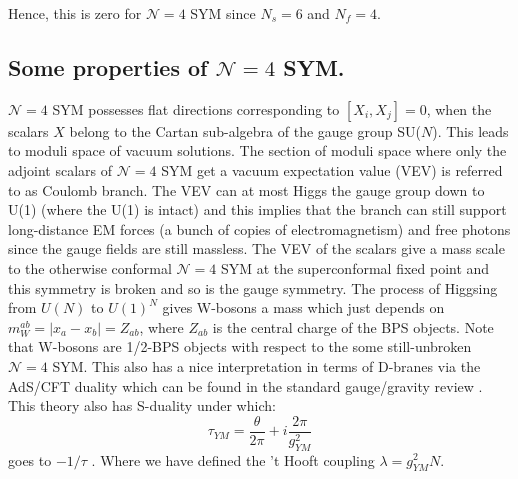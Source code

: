  Hence, this is zero for $\mathcal{N} = 4 $ SYM since $N_{s} = 6$ and $N_{f} = 4$. 
 
\subsection{Some properties of $\mathcal{N} = 4$ SYM.} 
 $\mathcal{N} = 4$ SYM possesses flat directions corresponding to $ [X_{i}, X_{j}] = 0$, when the scalars $X$ belong to the 
 Cartan sub-algebra of the gauge group SU($N$). This leads to moduli space of vacuum solutions. The section of moduli space where only the adjoint scalars of 
 $\mathcal{N} = 4$ SYM get a vacuum expectation value (VEV) is referred to as 
Coulomb branch. The VEV can at most Higgs the gauge group down to U(1) (where the U(1) is intact) 
and this implies that the branch can still support long-distance EM forces (a bunch of copies of electromagnetism) 
and free photons since the gauge fields are still massless. 
The VEV of the scalars give a mass scale to the otherwise conformal $\mathcal{N} = 4$ SYM at the superconformal fixed point
and this symmetry is broken and so is the gauge symmetry. The process of Higgsing from $U(N)$ to $U(1)^{N}$ gives W-bosons a mass which 
just depends on $ m_{W}^{ab}  = |x_a - x_b | = Z_{ab} $, where $Z_{ab}$ is the central charge of the BPS objects. 
Note that W-bosons are 1/2-BPS objects with respect to the some still-unbroken $\mathcal{N} = 4$ SYM. 
This also has a nice interpretation in terms of D-branes via the AdS/CFT duality which can be found in the standard 
gauge/gravity review \cite{Aharony:1999ti}. This theory also has S-duality under which:
\[ \tau_{YM} = \frac{\theta}{2\pi} + i \frac{2\pi}{g^{2}_{YM}} \]
goes to $ -1/\tau$ . Where we have defined the 't Hooft coupling $ \lambda = g_{YM}^{2} N $. 


